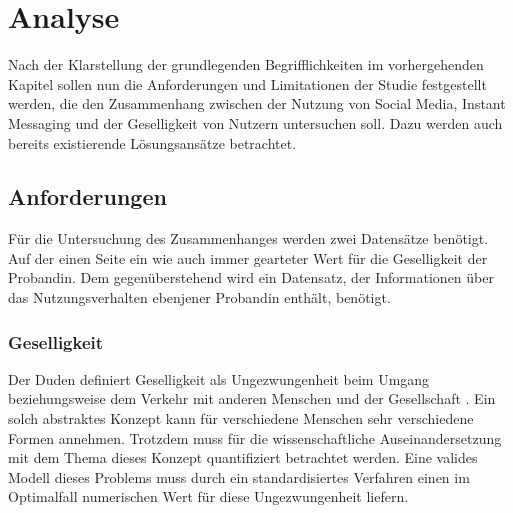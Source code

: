 
\chapter{Analyse}
\label{ch:Analyse}

Nach der Klarstellung der grundlegenden Begrifflichkeiten im vorhergehenden Kapitel
sollen nun die Anforderungen und Limitationen der Studie festgestellt werden, die den
Zusammenhang zwischen der Nutzung von Social Media, Instant Messaging und der Geselligkeit
von Nutzern untersuchen soll. 
Dazu werden auch bereits existierende Lösungsansätze betrachtet. 

\section{Anforderungen}
\label{ch:Analyse:sec:Anforderungen}


Für die Untersuchung des Zusammenhanges werden zwei Datensätze benötigt.
Auf der einen Seite ein wie auch immer gearteter Wert für die Geselligkeit der Probandin. 
Dem gegenüberstehend wird ein Datensatz, der Informationen über das Nutzungsverhalten ebenjener Probandin enthält, benötigt.
\par

\subsection{Geselligkeit}

Der Duden definiert Geselligkeit als Ungezwungenheit beim Umgang beziehungsweise dem Verkehr mit anderen Menschen und der Gesellschaft \cite{dudengesell}.
Ein solch abstraktes Konzept kann für verschiedene Menschen sehr verschiedene Formen annehmen.
Trotzdem muss für die wissenschaftliche Auseinandersetzung mit dem Thema dieses Konzept quantifiziert betrachtet werden.
Eine valides Modell dieses Problems muss durch ein standardisiertes Verfahren einen im Optimalfall numerischen Wert für diese Ungezwungenheit liefern. 
\par

